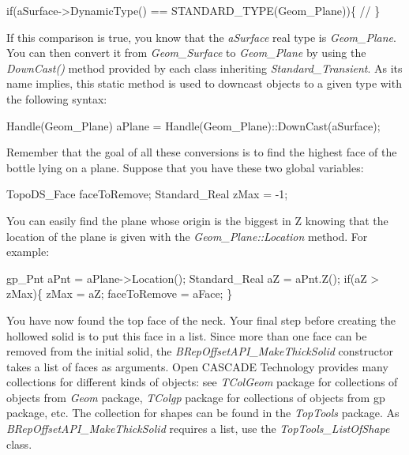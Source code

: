 \begin{DoxyCode}
\textcolor{keywordflow}{if}(aSurface->DynamicType() == STANDARD\_TYPE(Geom\_Plane))\{
\textcolor{comment}{//}
\}
\end{DoxyCode}


If this comparison is true, you know that the {\itshape a\+Surface} real type is {\itshape Geom\+\_\+\+Plane}. You can then convert it from {\itshape Geom\+\_\+\+Surface} to {\itshape Geom\+\_\+\+Plane} by using the {\itshape Down\+Cast()} method provided by each class inheriting {\itshape Standard\+\_\+\+Transient}. As its name implies, this static method is used to downcast objects to a given type with the following syntax\+:


\begin{DoxyCode}
Handle(Geom\_Plane) aPlane = Handle(Geom\_Plane)::DownCast(aSurface);
\end{DoxyCode}


Remember that the goal of all these conversions is to find the highest face of the bottle lying on a plane. Suppose that you have these two global variables\+:


\begin{DoxyCode}
TopoDS\_Face faceToRemove;
Standard\_Real zMax = -1;
\end{DoxyCode}


You can easily find the plane whose origin is the biggest in Z knowing that the location of the plane is given with the {\itshape Geom\+\_\+\+Plane\+::\+Location} method. For example\+:


\begin{DoxyCode}
gp\_Pnt aPnt = aPlane->Location();
Standard\_Real aZ = aPnt.Z();
\textcolor{keywordflow}{if}(aZ > zMax)\{
    zMax = aZ;
    faceToRemove = aFace;
\}
\end{DoxyCode}


You have now found the top face of the neck. Your final step before creating the hollowed solid is to put this face in a list. Since more than one face can be removed from the initial solid, the {\itshape B\+Rep\+Offset\+A\+P\+I\+\_\+\+Make\+Thick\+Solid} constructor takes a list of faces as arguments. Open C\+A\+S\+C\+A\+DE Technology provides many collections for different kinds of objects\+: see {\itshape T\+Col\+Geom} package for collections of objects from {\itshape Geom} package, {\itshape T\+Colgp} package for collections of objects from gp package, etc. The collection for shapes can be found in the {\itshape Top\+Tools} package. As {\itshape B\+Rep\+Offset\+A\+P\+I\+\_\+\+Make\+Thick\+Solid} requires a list, use the {\itshape Top\+Tools\+\_\+\+List\+Of\+Shape} class.


